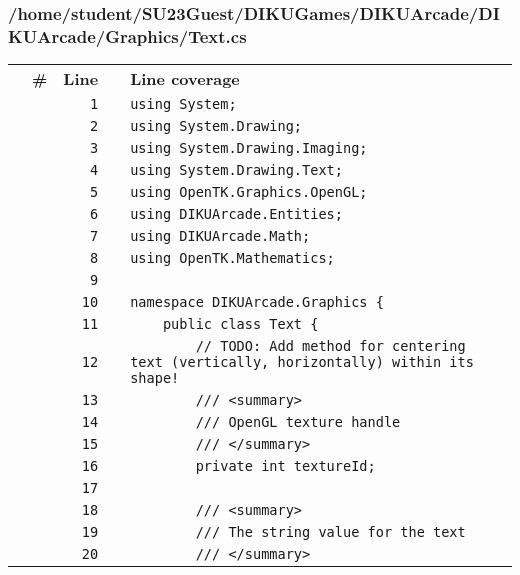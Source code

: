 \documentclass[a4paper,landscape,10pt]{article}
\begin{document}
\subsubsection{/home/student/SU23Guest/DIKUGames/DIKUArcade/DIKUArcade/Graphics/Text.cs}
\begin{longtable}[l]{lrrll}
\textbf{} & \textbf{\#} & \textbf{Line} & \textbf{} & \textbf{Line coverage}\\
\cellcolor{gray} &  & \verb~1~ & & \verb~using System;~\\
\cellcolor{gray} &  & \verb~2~ & & \verb~using System.Drawing;~\\
\cellcolor{gray} &  & \verb~3~ & & \verb~using System.Drawing.Imaging;~\\
\cellcolor{gray} &  & \verb~4~ & & \verb~using System.Drawing.Text;~\\
\cellcolor{gray} &  & \verb~5~ & & \verb~using OpenTK.Graphics.OpenGL;~\\
\cellcolor{gray} &  & \verb~6~ & & \verb~using DIKUArcade.Entities;~\\
\cellcolor{gray} &  & \verb~7~ & & \verb~using DIKUArcade.Math;~\\
\cellcolor{gray} &  & \verb~8~ & & \verb~using OpenTK.Mathematics;~\\
\cellcolor{gray} &  & \verb~9~ & & \verb~~\\
\cellcolor{gray} &  & \verb~10~ & & \verb~namespace DIKUArcade.Graphics {~\\
\cellcolor{gray} &  & \verb~11~ & & \verb~    public class Text {~\\
\cellcolor{gray} &  & \verb~12~ & & \verb~        // TODO: Add method for centering text (vertically, horizontally) within its shape!~\\
\cellcolor{gray} &  & \verb~13~ & & \verb~        /// <summary>~\\
\cellcolor{gray} &  & \verb~14~ & & \verb~        /// OpenGL texture handle~\\
\cellcolor{gray} &  & \verb~15~ & & \verb~        /// </summary>~\\
\cellcolor{gray} &  & \verb~16~ & & \verb~        private int textureId;~\\
\cellcolor{gray} &  & \verb~17~ & & \verb~~\\
\cellcolor{gray} &  & \verb~18~ & & \verb~        /// <summary>~\\
\cellcolor{gray} &  & \verb~19~ & & \verb~        /// The string value for the text~\\
\cellcolor{gray} &  & \verb~20~ & & \verb~        /// </summary>~\\

\end{longtable}
\end{document}
